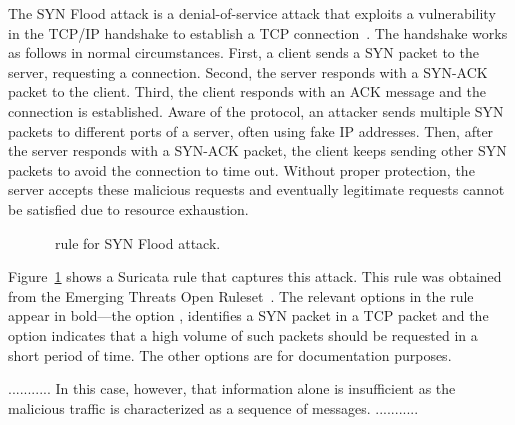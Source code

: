 \documentclass[sigconf,review, anonymous]{acmart}
\begin{document}
The SYN Flood attack is a denial-of-service attack that exploits a vulnerability in the TCP/IP handshake
to establish a TCP connection~\cite{cloudfare-synflood}. The handshake
works as follows in normal circumstances. First, a client sends a SYN
packet to the server, requesting a connection. Second, the server
responds with a SYN-ACK packet to the client. Third, the client
responds with an ACK message and the connection is established. Aware
of the protocol, an attacker sends multiple SYN packets to different
ports of a server, often using fake IP addresses. Then, after the
server responds with a SYN-ACK packet, the client keeps sending other
SYN packets to avoid the connection to time out. Without proper
protection, the server accepts these malicious requests and eventually
legitimate requests cannot be satisfied due to resource exhaustion.

\vspace{-1ex}
\begin{figure}[h!]
  
  \vspace{-2ex}
  \caption{\suri\ rule for SYN Flood attack.}
  \label{fig:synflood-example}
\end{figure}
\vspace{-2ex}

Figure~\ref{fig:synflood-example} shows a Suricata rule that captures
this attack. This rule was obtained from the Emerging Threats Open
Ruleset~\cite{emerging-threats-open}. The relevant options in the
rule appear in bold---the option , identifies a
SYN packet in a TCP packet and the option  indicates that a high
volume of such packets should be requested in a short period of
time. The other options are for documentation purposes.


...........
In this case, however, that information alone is
insufficient as the malicious traffic is characterized as a sequence
of messages. 
...........



\begin{figure}[h]
  \vspace{-2ex}
  
  \vspace{-2ex}  
\end{figure}
\end{document}
